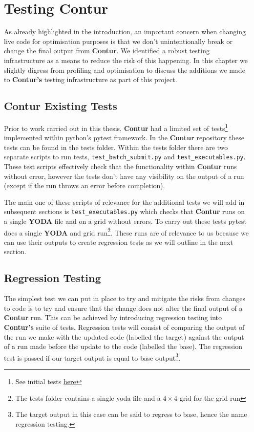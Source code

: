 \chapter{Testing Contur}
\label{chapterlabel4}
As already highlighted in the introduction, an important concern when changing live code for optimisation purposes is that we don't unintentionally break or change the final output from \textbf{Contur}.  We identified a robust testing infrastructure as a means to reduce the risk of this happening. In this chapter we slightly digress from profiling and optimisation to discuss the additions we made to \textbf{Contur's} testing infrastructure as part of this project.

\section{Contur Existing Tests}
Prior to work carried out in this thesis, \textbf{Contur} had a limited set of tests\footnote{See initial tests \href{https://gitlab.com/hepcedar/contur/-/tree/49a67e039cf93c88b39dade3dfb7c5f03e780fb2/tests}{here}} implemented within python's pytest framework\cite{pytest}. In the \textbf{Contur} repository these tests can be found in the tests folder. Within the tests folder there are two separate scripts to run tests, \texttt{test\_batch\_submit.py} and \texttt{test\_executables.py}. These test scripts effectively check that the functionality within \textbf{Contur} runs without error, however the tests don't have any visibility on the output of a run (except if the run throws an error before completion).

The main one of these scripts of relevance for the additional tests we will add in subsequent sections is \texttt{test\_executables.py} which checks that \textbf{Contur} runs on a single \textbf{YODA} file and on a grid without errors. To carry out these tests pytest does a single \textbf{YODA} and grid run\footnote{The tests folder contains a single yoda file and a $4 \times 4$ grid for the grid run}. These runs are of relevance to us because we can use their outputs to create regression tests as we will outline in the next section.

\section{Regression Testing}
The simplest test we can put in place to try and mitigate the risks from changes to code is to try and ensure that the change does not alter the final output of a \textbf{Contur} run. This can be achieved by introducing regression testing into \textbf{Contur's} suite of tests. Regression tests will consist of comparing the output of the run we make with the updated code (labelled the target) against the output of a run made before the update to the code (labelled the base). The regression test is passed if our target output is equal to base output\footnote{The target output in this case can be said to regress to base, hence the name regression testing.}. 

